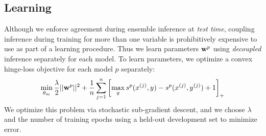 \subsection{Learning} Although we enforce agreement during ensemble inference 
at {\em test time}, coupling inference during training for more than one 
variable is prohibitively expensive to use as part of a learning procedure.  
Thus we learn
parameters $\mathbf{w}^p$ using {\em decoupled} inference separately for
each model. To learn parameters, we optimize a convex hinge-loss
objective for each model $p$ separately:
 \begin{align}
\min_{\theta_m} \frac{\lambda}{2}||\mathbf{w}^p||^2 +
\frac{1}{n}\sum_{j=1}^n \left[ \max_y s^p(x^{(j)},y) - s^p(x^{(j)},y^{(j)})
+1\right]_+
\end{align}
We optimize this problem via stochastic sub-gradient descent, and we choose
$\lambda$ and the number of training epochs using a held-out
development set to minimize error.



